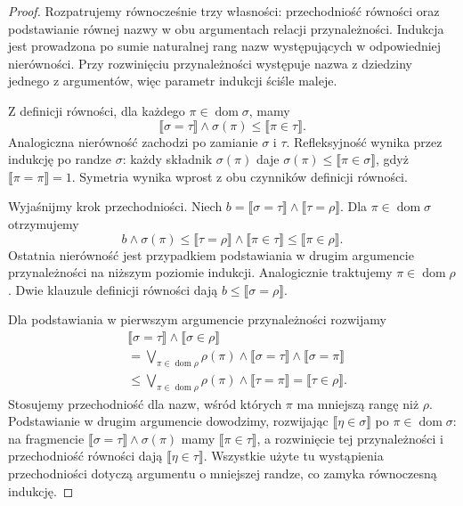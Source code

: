\begin{proof}
Rozpatrujemy równocześnie trzy własności:
przechodniość równości oraz podstawianie
równej nazwy w obu argumentach relacji
przynależności. Indukcja jest prowadzona
po sumie naturalnej rang nazw występujących
w odpowiedniej nierówności. Przy rozwinięciu
przynależności występuje nazwa z dziedziny
jednego z argumentów, więc parametr
indukcji ściśle maleje.

Z definicji równości, dla każdego
$\pi\in\operatorname{dom}\sigma$, mamy
\[
 \llbracket\sigma=\tau\rrbracket
 \wedge\sigma(\pi)
 \le\llbracket\pi\in\tau\rrbracket.
\]
Analogiczna nierówność zachodzi
po zamianie $\sigma$ i $\tau$.
Refleksyjność wynika przez indukcję
po randze $\sigma$: każdy składnik
$\sigma(\pi)$ daje
$\sigma(\pi)\le\llbracket\pi\in\sigma
\rrbracket$, gdyż
$\llbracket\pi=\pi\rrbracket=1$.
Symetria wynika wprost z obu
czynników definicji równości.

Wyjaśnijmy krok przechodniości.
Niech
$b=\llbracket\sigma=\tau\rrbracket
 \wedge\llbracket\tau=\rho\rrbracket$.
Dla $\pi\in\operatorname{dom}\sigma$
otrzymujemy
\[
 b\wedge\sigma(\pi)
 \le\llbracket\tau=\rho\rrbracket
     \wedge\llbracket\pi\in\tau\rrbracket
 \le\llbracket\pi\in\rho\rrbracket.
\]
Ostatnia nierówność jest
przypadkiem podstawiania w drugim
argumencie przynależności na
niższym poziomie indukcji.
Analogicznie traktujemy
$\pi\in\operatorname{dom}\rho$.
Dwie klauzule definicji równości
dają $b\le\llbracket\sigma=\rho\rrbracket$.

Dla podstawiania w pierwszym
argumencie przynależności
rozwijamy
\[
\begin{aligned}
 &\llbracket\sigma=\tau\rrbracket
   \wedge\llbracket\sigma\in\rho\rrbracket\\
 &=\bigvee_{\pi\in\operatorname{dom}\rho}
   \rho(\pi)\wedge
   \llbracket\sigma=\tau\rrbracket\wedge
   \llbracket\sigma=\pi\rrbracket\\
 &\le\bigvee_{\pi\in\operatorname{dom}\rho}
   \rho(\pi)\wedge\llbracket\tau=\pi\rrbracket
   =\llbracket\tau\in\rho\rrbracket.
\end{aligned}
\]
Stosujemy przechodniość dla nazw,
wśród których $\pi$ ma mniejszą
rangę niż $\rho$. Podstawianie
w drugim argumencie dowodzimy,
rozwijając
$\llbracket\eta\in\sigma\rrbracket$
po $\pi\in\operatorname{dom}\sigma$:
na fragmencie
$\llbracket\sigma=\tau\rrbracket
\wedge\sigma(\pi)$ mamy
$\llbracket\pi\in\tau\rrbracket$,
a rozwinięcie tej przynależności
i przechodniość równości dają
$\llbracket\eta\in\tau\rrbracket$.
Wszystkie użyte tu wystąpienia
przechodniości dotyczą argumentu
o mniejszej randze, co zamyka
równoczesną indukcję.


\end{proof}
